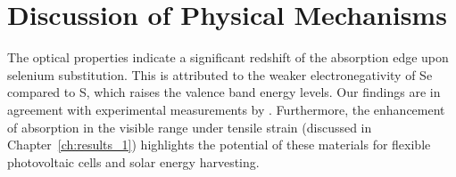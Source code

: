 \section{Discussion of Physical Mechanisms}
The optical properties indicate a significant redshift of the absorption edge upon selenium substitution. This is attributed to the weaker electronegativity of Se compared to S, which raises the valence band energy levels. Our findings are in agreement with experimental measurements by \citet{novoselov2005}.
Furthermore, the enhancement of absorption in the visible range under tensile strain (discussed in Chapter~\ref{ch:results_1}) highlights the potential of these materials for flexible photovoltaic cells and solar energy harvesting.
